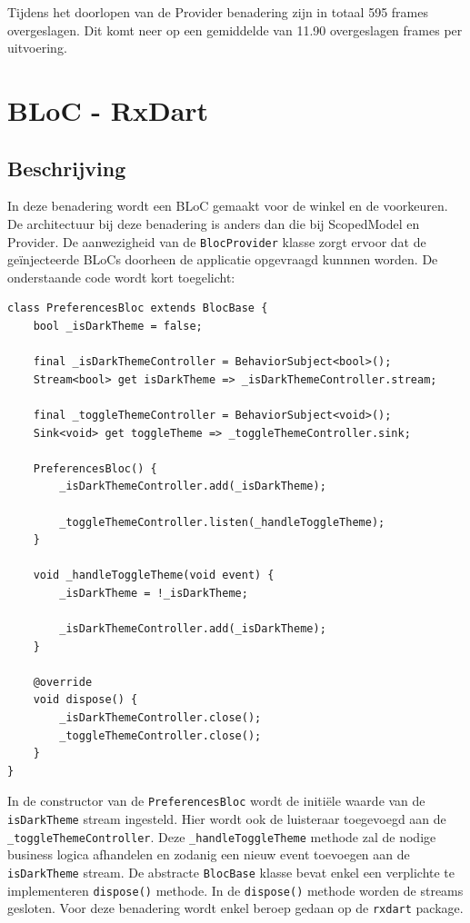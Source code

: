 Tijdens het doorlopen van de Provider benadering zijn in totaal 595 frames overgeslagen. Dit komt neer op een gemiddelde van 11.90 overgeslagen frames per uitvoering.

\section{BLoC - RxDart}
\subsection{Beschrijving}
In deze benadering wordt een BLoC gemaakt voor de winkel en de voorkeuren. De architectuur bij deze benadering is anders dan die bij ScopedModel en Provider. 
De aanwezigheid van de \verb|BlocProvider| klasse zorgt ervoor dat de geïnjecteerde BLoCs doorheen de applicatie opgevraagd kunnnen worden. \newline \newline
De onderstaande code wordt kort toegelicht:

\begin{verbatim}
class PreferencesBloc extends BlocBase {
    bool _isDarkTheme = false;
    
    final _isDarkThemeController = BehaviorSubject<bool>();
    Stream<bool> get isDarkTheme => _isDarkThemeController.stream;
    
    final _toggleThemeController = BehaviorSubject<void>();
    Sink<void> get toggleTheme => _toggleThemeController.sink;
    
    PreferencesBloc() {
        _isDarkThemeController.add(_isDarkTheme);
    
        _toggleThemeController.listen(_handleToggleTheme);
    }
    
    void _handleToggleTheme(void event) {
        _isDarkTheme = !_isDarkTheme;
    
        _isDarkThemeController.add(_isDarkTheme);
    }
    
    @override
    void dispose() {
        _isDarkThemeController.close();
        _toggleThemeController.close();
    }
}
\end{verbatim}
In de constructor van de \verb|PreferencesBloc| wordt de initiële waarde van de \verb|isDarkTheme| stream ingesteld. Hier wordt ook de luisteraar toegevoegd aan de \verb|_toggleThemeController|. Deze \verb|_handleToggleTheme| methode zal de nodige business logica afhandelen en zodanig een nieuw event toevoegen aan de \verb|isDarkTheme| stream.
De abstracte \verb|BlocBase| klasse bevat enkel een verplichte te implementeren \verb|dispose()| methode. In de \verb|dispose()| methode worden de streams gesloten. \newline \newline
Voor deze benadering wordt enkel beroep gedaan op de \verb|rxdart| package. 

